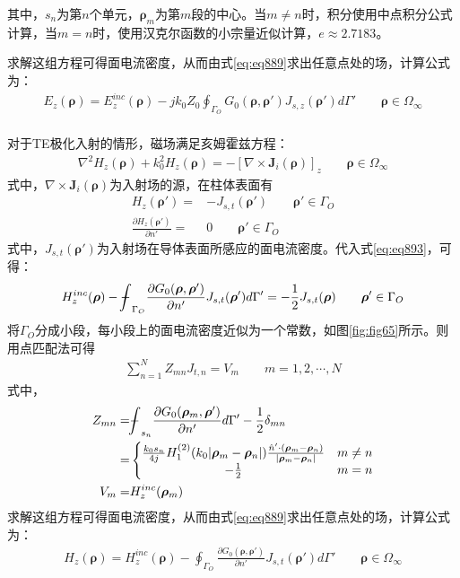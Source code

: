 \documentclass{article}
\numberwithin{equation}{section}
\renewcommand{\vec}[1]{\boldsymbol{#1}}
\begin{document}
其中，$s_n$为第$n$个单元，$\vec{\rho}_m$为第$m$段的中心。当$m\neq n$时，积分使用中点积分公式计算，当$m=n$时，使用汉克尔函数的小宗量近似计算，$e\approx 2.7183$。\par
求解这组方程可得面电流密度，从而由式\ref{eq:eq889}求出任意点处的场，计算公式为：
\begin{align}
    \label{eq:eq901}
    E_z(\vec{\rho})=E_z^{inc}(\vec{\rho})-jk_0Z_0\oint_{\Gamma_O}G_0(\vec{\rho},\vec{\rho}')J_{s,z}(\vec{\rho}')d\Gamma'\qquad\vec{\rho}\in\Omega_{\infty}
\end{align}
\\

对于TE极化入射的情形，磁场满足亥姆霍兹方程：
\begin{align}
    \label{eq:eq902}
    \nabla^2H_z(\vec{\rho})+k^2_0H_z(\vec{\rho})=-[\nabla\times\mathbf{J}_i(\vec{\rho})]_z\qquad\vec{\rho}\in\Omega_{\infty}
\end{align}
式中，$\nabla\times\mathbf{J}_i(\vec{\rho})$为入射场的源，在柱体表面有
\begin{align}
    \label{eq:eq903}
    H_z(\vec{\rho}')=&-J_{s,t}(\vec{\rho}')\qquad\vec{\rho}'\in\Gamma_O \\
    \label{eq:eq904}
    \frac{\partial H_z(\vec{\rho}')}{\partial n'}=&0\qquad\vec{\rho}'\in\Gamma_O
\end{align}
式中，$J_{s,t}(\vec{\rho}')$为入射场在导体表面所感应的面电流密度。代入式\ref{eq:eq893}，可得\textbf{\color{blue}{磁场积分方程(MFIE)}}：
\begin{align}
    \label{eq:eq905}
    H_z^{inc}(\vec{\rho})-\bbint_{\Gamma_O}\frac{\partial G_0(\vec{\rho},\vec{\rho}')}{\partial n'}J_{s,t}(\vec{\rho}')d\Gamma'=-\frac{1}{2}J_{s,t}(\vec{\rho})\qquad\vec{\rho}'\in\Gamma_O
\end{align}
将$\Gamma_O$分成小段，每小段上的面电流密度近似为一个常数，如图\ref{fig:fig65}所示。则用点匹配法可得
\begin{align}
    \label{eq:eq906}
    \sum_{n=1}^{N}Z_{mn}J_{t,n}=V_m\qquad m=1,2,\cdots,N
\end{align}
式中，
\begin{align}
    \label{eq:eq907}
    Z_{mn}=&\bbint_{s_n}\frac{\partial G_0(\vec{\rho}_m,\vec{\rho}')}{\partial n'}d\Gamma'-\frac{1}{2}\delta_{mn} \nonumber \\
          =&\left\{
        \begin{matrix}
            \frac{k_0s_n}{4j}H_1^{(2)}(k_0|\vec{\rho}_m-\vec{\rho}_n|)\frac{\hat{n}'\cdot(\vec{\rho}_m-\vec{\rho}_n)}{|\vec{\rho}_m-\vec{\rho}_n|} & m\neq n \\
            -\frac{1}{2} & m=n \\
        \end{matrix}
    \right. \\
    \label{eq:eq908}
    V_m=&H^{inc}_z(\vec{\rho}_m)
\end{align}
求解这组方程可得面电流密度，从而由式\ref{eq:eq889}求出任意点处的场，计算公式为：
\begin{align}
    \label{eq:eq909}
    H_z(\vec{\rho})=H_z^{inc}(\vec{\rho})-\oint_{\Gamma_O}\frac{\partial G_0(\vec{\rho},\vec{\rho}')}{\partial n'}J_{s,t}(\vec{\rho}')d\Gamma'\qquad\vec{\rho}\in\Omega_{\infty}
\end{align}
\end{document}
